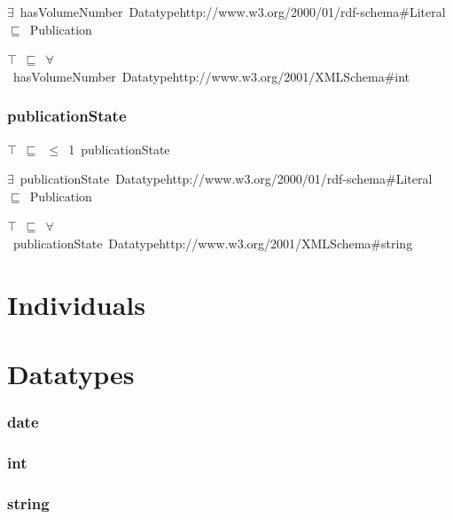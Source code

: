 \documentclass{article}
\begin{document}
\ensuremath{\exists}~hasVolumeNumber~Datatypehttp://www.w3.org/2000/01/rdf-schema#Literal~\ensuremath{\sqsubseteq}~Publication

\ensuremath{\top}~\ensuremath{\sqsubseteq}~\ensuremath{\forall}~hasVolumeNumber~Datatypehttp://www.w3.org/2001/XMLSchema#int

\subsubsection*{publicationState}

\ensuremath{\top}~\ensuremath{\sqsubseteq}~\ensuremath{\leq}~1~publicationState

\ensuremath{\exists}~publicationState~Datatypehttp://www.w3.org/2000/01/rdf-schema#Literal~\ensuremath{\sqsubseteq}~Publication

\ensuremath{\top}~\ensuremath{\sqsubseteq}~\ensuremath{\forall}~publicationState~Datatypehttp://www.w3.org/2001/XMLSchema#string

\section*{Individuals}\section*{Datatypes}\subsubsection*{date}

\subsubsection*{int}

\subsubsection*{string}
\end{document}
